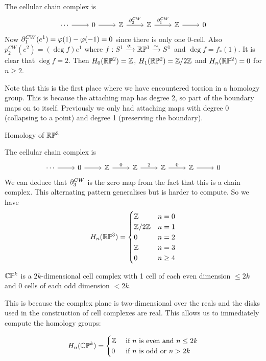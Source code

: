 The cellular chain complex is
\begin{equation*}
  \begin{tikzcd}
    \cdots \ar[r] & 0 \ar[r] & \ZZ \ar[r, "\p_2^{CW}"] & \ZZ \ar[r, "\p_1^{CW}"] & \ZZ \ar[r] & 0
  \end{tikzcd}
\end{equation*}
Now $\partial_1^{CW}(e^1) = \varphi(1)-\varphi(-1) = 0$ since there is only one $0$-cell.
Also $p_2^{CW}(e^2) = (\deg f)e^1$ where $f: S^1 \xrightarrow{q_1} \mathbb{R}\mathbb{P}^1 \xrightarrow{\sim} S^1$ and $\deg f = f_*(1)$.
It is clear that $\deg f = 2$.
Then $H_0(\mathbb{R}\mathbb{P}^2)=\mathbb{Z}$, $H_1(\mathbb{R}\mathbb{P}^2)=\mathbb{Z}/2\mathbb{Z}$ and $H_n(\mathbb{R}\mathbb{P}^2)=0$ for $n \geq 2$.

Note that this is the first place where we have encountered torsion in a homology group.
This is because the attaching map has degree 2, so part of the boundary maps on to itself.
Previously we only had attaching maps with degree 0 (collapsing to a point) and degree 1 (preserving the boundary).

Homology of $\mathbb{R}\mathbb{P}^3$

The cellular chain complex is
\begin{equation*}
  \begin{tikzcd}
    \cdots \ar[r] & 0 \ar[r] & \ZZ \ar[r, "0"] & \ZZ \ar[r, "2"] & \ZZ \ar[r, "0"] & \ZZ \ar[r] & 0
  \end{tikzcd}
\end{equation*}
We can deduce that $\partial_3^{CW}$ is the zero map from the fact that this is a chain complex.
This alternating pattern generalises but is harder to compute.
So we have
\begin{equation*}
  H_n(\mathbb{R}\mathbb{P}^3)=
  \begin{cases}
    \mathbb{Z} & n=0 \\
    \mathbb{Z}/2\mathbb{Z} & n=1 \\
    0 & n=2 \\
    \mathbb{Z} & n=3 \\
    0 & n \geq 4
  \end{cases}
\end{equation*}

\begin{lem}
  $\mathbb{C}\mathbb{P}^k$ is a $2k$-dimensional cell complex with 1 cell of each even dimension $\leq 2k$ and 0 cells of each odd dimension $<2k$.
\end{lem}

This is because the complex plane is two-dimensional over the reals and the disks used in the construction of cell complexes are real.
This allows us to immediately compute the homology groups:

\begin{cor}
  \begin{equation*}
    H_n(\mathbb{C}\mathbb{P}^k)=
    \begin{cases}
      \mathbb{Z} & \text{ if $n$ is even and $n \leq 2k$} \\
      0 & \text{ if $n$ is odd or $n > 2k$}
    \end{cases}
  \end{equation*}
\end{cor}
